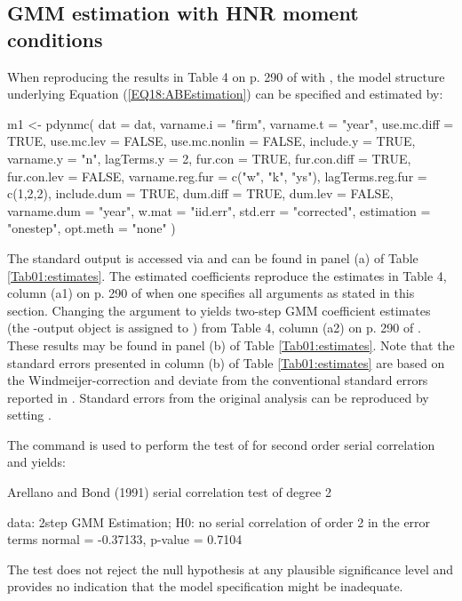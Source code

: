 \subsection{GMM estimation with HNR moment conditions} \label{sec:HNRmcEstimation}
When reproducing the results in Table 4 on p. 290 of \citet{AreBon1991} with , the model structure underlying Equation (\ref{EQ18:ABEstimation}) can be specified and estimated by:
\begin{example}
m1 <- pdynmc(
  dat = dat, varname.i = "firm", varname.t = "year",
  use.mc.diff = TRUE, use.mc.lev = FALSE, use.mc.nonlin = FALSE,
  include.y = TRUE, varname.y = "n", lagTerms.y = 2,
  fur.con = TRUE, fur.con.diff = TRUE, fur.con.lev = FALSE,
  varname.reg.fur = c("w", "k", "ys"), lagTerms.reg.fur = c(1,2,2),
  include.dum = TRUE, dum.diff = TRUE, dum.lev = FALSE, varname.dum = "year",
  w.mat = "iid.err", std.err = "corrected",
  estimation = "onestep", opt.meth = "none"
)
\end{example}
The standard output is accessed via  and can be found in panel (a) of Table \ref{Tab01:estimates}.
The estimated coefficients reproduce the estimates in Table 4, column (a1) on p. 290 of \citet{AreBon1991} when one specifies all arguments as stated in this section.
Changing the argument  to  yields two-step GMM coefficient estimates (the -output object is assigned to ) from Table 4, column (a2) on p. 290 of \citet{AreBon1991}. These results may be found in panel (b) of Table \ref{Tab01:estimates}.
Note that the standard errors presented in column (b) of Table \ref{Tab01:estimates} are based on the Windmeijer-correction and deviate from the conventional standard errors reported in \citet{AreBon1991}. Standard errors from the original analysis can be reproduced by setting .


The command  is used to perform the test of \citet{AreBon1991} for second order serial correlation and yields:
\begin{example}
        Arellano and Bond (1991) serial correlation test of degree 2

data:  2step GMM Estimation; H0: no serial correlation of order 2 in the error terms
normal = -0.37133, p-value = 0.7104
\end{example}
The test does not reject the null hypothesis at any plausible significance level and provides no indication that the model specification might be inadequate.

